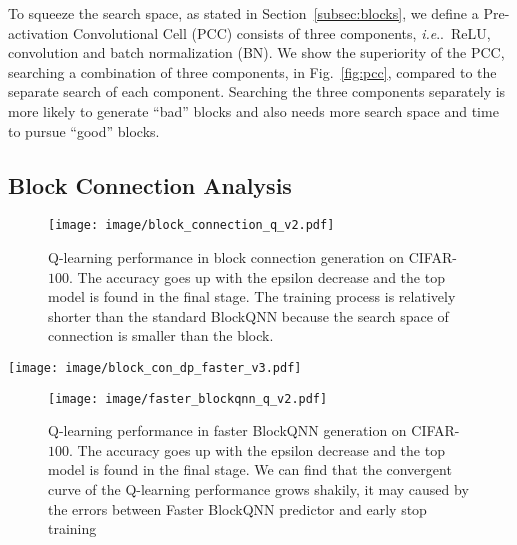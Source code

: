 \documentclass[10pt,journal,compsoc]{IEEEtran}
\makeatletter
\DeclareRobustCommand\onedot{\futurelet\@let@token\@onedot}
\def\@onedot{\ifx\@let@token.\else.\null\fi\xspace}
\def\ie{\emph{i.e}\onedot} \def\Ie{\emph{I.e}\onedot}
\makeatother
\begin{document}
To squeeze the search space, as stated in Section~\ref{subsec:blocks}, we define a Pre-activation Convolutional Cell (PCC) consists of three components, \ie~ReLU, convolution and batch normalization (BN). We show the superiority of the PCC, searching a combination of three components, in Fig.~\ref{fig:pcc}, compared to the separate search of each component. Searching the three components separately is more likely to generate ``bad'' blocks and also needs more search space and time to pursue ``good'' blocks.









\subsection{Block Connection Analysis}

\begin{figure}[tbp]
	\centering
	\texttt{[image: image/block\_connection\_q\_v2.pdf]}
	\caption{Q-learning performance in block connection generation on CIFAR-$100$. The accuracy goes up with the epsilon decrease and the top model is found in the final stage. The training process is relatively shorter than the standard BlockQNN because the search space of connection is smaller than the block. }\label{fig:con_q}
\end{figure}

\begin{figure*}[tbp]
	\centering
	\texttt{[image: image/block\_con\_dp\_faster\_v3.pdf]}
	\caption{(a) Topology of the best connection style between blocks generated by block Connection, named Block-QNN-Connection. Note that the basic block we used here is Block-QNN-S, \ie~Fig.~\ref{fig:8}(d). (b) Topology of the top block structures generated by Faster BlockQNN. We call it Block-QNN-Faster. (c) Topology of the best block structures generated with advanced depthwise convolution operation, named Block-QNN-Depthwise. All convolution operation be replaced by a cell with four components,  \ie~\textit{ReLU}, \textit{Depthwise Convolution}, \textit{Pointwise Convolution} and \textit{Batch Normalization}. 
     }
	\label{fig:block_con_dp_faster}
\end{figure*}

\begin{figure}[tbp]
	\centering
	\texttt{[image: image/faster\_blockqnn\_q\_v2.pdf]}
	\caption{Q-learning performance in faster BlockQNN generation on CIFAR-$100$. The accuracy goes up with the epsilon decrease and the top model is found in the final stage. We can find that the convergent curve of the Q-learning performance grows shakily, it may caused by the errors between Faster BlockQNN predictor and early stop training}\label{fig:faster_q}
\end{figure}
\end{document}
